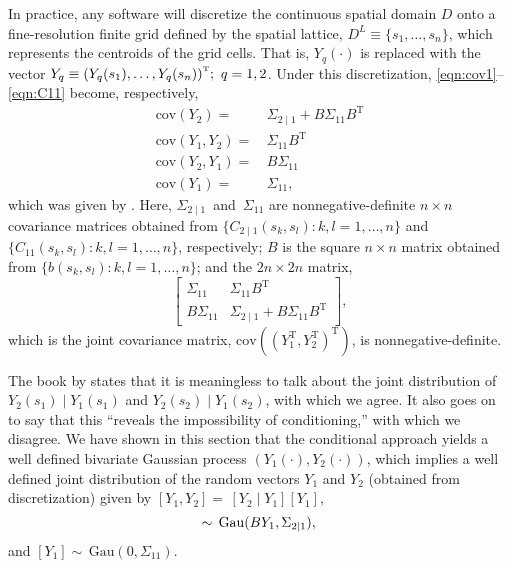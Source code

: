 \documentclass[lineno]{biometrika}
\def\T{{ \mathrm{\scriptscriptstyle T} }}
\newcommand{\s}{s}
\newcommand{\Y}{Y}
\newcommand{\Yvec}{Y}
\newcommand{\bB}{B}
\newcommand{\bzero}{0}
\newcommand{\bSigma}{\Sigma}
\newcommand{\cov}{\mathrm{cov}}
\newcommand{\Gau}{\mathrm{Gau}}
\let\originalleft\left
\let\originalright\right
\renewcommand{\left}{\mathopen{}\mathclose\bgroup\originalleft}
\renewcommand{\right}{\aftergroup\egroup\originalright}
\begin{document}
In practice, any software will discretize the continuous spatial domain $D$ onto a fine-resolution finite grid defined by the spatial lattice, $D^L \equiv\{\s_1,\ldots,\s_n\}$, which represents the centroids of the grid cells. That is, $Y_q(\cdot)$ is replaced with the vector $\Y_q\equiv \left(Y_q(\s_1),\ldots,Y_q(\s_n)\right)^\T;~q=1,2$. Under this discretization, \eqref{eqn:cov1}--\eqref{eqn:C11} become, respectively,
\begin{align}
\cov(\Y_2)=&\,\bSigma_{2\mid 1}+\bB\bSigma_{11}\bB^\T\label{eqn:cov-Y2}\\
\cov(\Y_1,\Y_2)=&\,\bSigma_{11}\bB^\T\label{eqn:cov-Y1-Y2}\\
\cov(\Y_2,\Y_1)=&\,\bB\bSigma_{11}\label{eqn:cov-Y2-Y1}\\
\cov(\Y_1)=&\,\bSigma_{11},\label{eqn:cov-Y1}
\end{align}
which was given by \citet[p.~160]{CressieWikle2011}. Here, $\bSigma_{2\mid 1}$~and~$\bSigma_{11}$ are nonnegative-definite $n\times n$ covariance matrices obtained from $\{C_{2\mid 1}(\s_k,\s_l):k,l=1,\ldots,n\}$ and $\{C_{11}(\s_k,\s_l):k,l=1,\ldots,n\}$, respectively; $\bB$ is the square $n\times n$ matrix obtained from $\{b(\s_k,\s_l):k,l=1,\ldots,n\}$; and the $2n\times 2n$ matrix,
\begin{equation}\label{eqn:cov-matrix}
  \begin{bmatrix}\bSigma_{11} & \bSigma_{11}\bB^\T \\ \bB \bSigma_{11} & \bSigma_{2\mid 1}+\bB\bSigma_{11}\bB^\T  \end{bmatrix},
\end{equation}
which is the joint covariance matrix, $\cov((\Yvec_1^\T,\Yvec_2^\T)^\T)$, is nonnegative-definite.

The book by \citet[p.~273]{Banerjeeetal2015} states that it is meaningless to talk about the joint distribution of $Y_2(\s_1)\mid Y_1(\s_1)$ and $Y_2(\s_2)\mid Y_1(\s_2)$, with which we agree. It also goes on to say that this ``reveals the impossibility of conditioning,'' with which we disagree. We have shown in this section that the conditional approach yields a well defined bivariate Gaussian process $(Y_1(\cdot),Y_2(\cdot))$, which implies a well defined joint distribution of the random vectors $\Y_1$ and $\Y_2$ (obtained from discretization) given by $[\Y_1,\Y_2]=\, [\Y_2\mid \Y_1][\Y_1]$,
\begin{equation}
  [\Y_2\mid \Y_1]\sim\, \Gau(\bB\Y_1,\bSigma_{2\mid 1}),\label{eqn:rand-vect-model}\\  
\end{equation}
\noindent and $[\Y_1]\sim\, \Gau(\bzero,\bSigma_{11}).$
\end{document}
